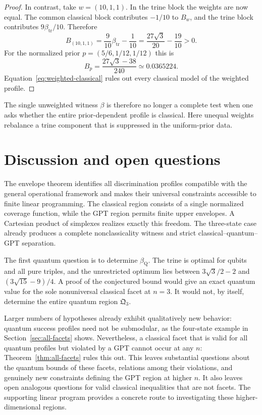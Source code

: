 \documentclass[10pt,a4paper]{amsart}
\newcommand{\1}{\mathbf 1}
\newcommand{\Qreg}{\mathfrak Q}
\newcommand{\btr}{\beta_{\mathrm{tr}}}
\begin{document}
\begin{proof}
In contrast, take $w=(10,1,1)$. In the trine block the weights are now equal.
The common classical block contributes $-1/10$ to $B_w$, and the trine block
contributes $9\btr/10$. Therefore
\begin{equation}\label{eq:hidden-weighted-beta}
 B_{(10,1,1)}=\frac9{10}\btr-\frac1{10}
 =\frac{27\sqrt3}{20}-\frac{19}{10}>0.
\end{equation}
For the normalized prior $p=(5/6,1/12,1/12)$ this is
\[
 B_p=\frac{27\sqrt3-38}{240}\simeq0.0365224.
\]
Equation~\eqref{eq:weighted-classical} rules out every classical model of the
weighted profile.
\end{proof}

The single unweighted witness $\beta$ is therefore no longer a complete test
when one asks whether the entire prior-dependent profile is classical. Here
unequal weights rebalance a trine component that is suppressed in the
uniform-prior data.

\section{Discussion and open questions}\label{sec:discussion}

The envelope theorem identifies all discrimination profiles compatible with
the general operational framework and makes their universal constraints
accessible to finite linear programming. The classical region consists of a
single normalized coverage function, while the GPT region permits finite upper
envelopes. A Cartesian product of simplexes realizes exactly this freedom.
The three-state case already produces a complete nonclassicality witness and
strict classical--quantum--GPT separation.

The first quantum question is to determine $\beta_{\mathrm Q}$. The trine is
optimal for qubits and all pure triples, and the unrestricted optimum lies
between $3\sqrt3/2-2$ and $(3\sqrt{15}-9)/4$. A proof of the conjectured
bound would give
an exact quantum value for the sole nonuniversal classical facet at $n=3$.
It would not, by itself, determine the entire quantum region $\Qreg_3$.

Larger numbers of hypotheses already exhibit qualitatively new behavior:
quantum success profiles need not be submodular, as the four-state example in
Section~\ref{sec:all-facets} shows. Nevertheless, a classical facet that is
valid for all quantum profiles but violated by a GPT cannot occur at any $n$:
Theorem~\ref{thm:all-facets} rules this out. This leaves substantial questions
about the quantum bounds of these facets, relations among their violations,
and genuinely new constraints defining the GPT region at higher $n$.
It also leaves open analogous questions for valid classical inequalities
that are not facets. The supporting linear program provides a concrete route
to investigating these higher-dimensional regions.
\end{document}
